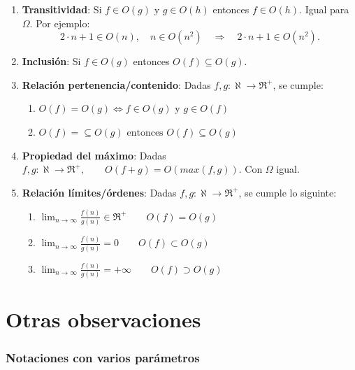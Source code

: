 \documentclass[10pt,a4paper,spanish]{report}
\theoremstyle{definition}
\theoremstyle{remark}
\begin{document}
    \begin{enumerate}[$\spadesuit$]
        \item \textbf{\textcolor{YellowOrange}{Transitividad}}: Si $f \in O(g) \text{ y } g \in O(h)$ entonces $f \in O(h)$. Igual para $\Omega$. Por ejemplo:
        \begin{displaymath}
            2 \cdot n + 1\in O(n), \quad n \in O(n^2) \quad \Rightarrow \quad 2 \cdot n + 1\in O(n^2).
        \end{displaymath}
        \item \textbf{\textcolor{YellowOrange}{Inclusión}}: Si $f \in O(g)$ entonces $O(f) \subseteq O(g)$.
        \item \textbf{\textcolor{YellowOrange}{Relación pertenencia/contenido}}: Dadas $f,g:\aleph \rightarrow \Re^+$, se cumple:
            \begin{enumerate}[$\rightarrow$]
                \item $O(f) = O(g) \Leftrightarrow f \in O(g) \text{ y } g \in O(f)$
                \item $O(f) = \subseteq O(g) \text{ entonces } O(f) \subseteq O(g)$
            \end{enumerate}
        \item \textbf{\textcolor{YellowOrange}{Propiedad del máximo}}: Dadas $f,g: \aleph \rightarrow \Re^+, \qquad O(f+g) = O(max(f,g))$. Con $\Omega$ igual.
        \item \textbf{\textcolor{YellowOrange}{Relación límites/órdenes}}: Dadas $f,g: \aleph \rightarrow \Re^+$, se cumple lo siguinte:
            \begin{enumerate}[$\rightarrow$]
                \item $\lim_{n \rightarrow \infty} \frac{f(n)}{g(n)} \in \Re^+ \qquad O(f) = O(g)$
                \item $\lim_{n \rightarrow \infty} \frac{f(n)}{g(n)} = 0 \qquad O(f) \subset O(g)$
                \item $\lim_{n \rightarrow \infty} \frac{f(n)}{g(n)} = +\infty \qquad O(f) \supset O(g)$
            \end{enumerate}
    \end{enumerate}

    \section{\textcolor{YellowOrange}Otras observaciones}

    \subsubsection{\textcolor{YellowOrange}Notaciones con varios parámetros}
\end{document}
